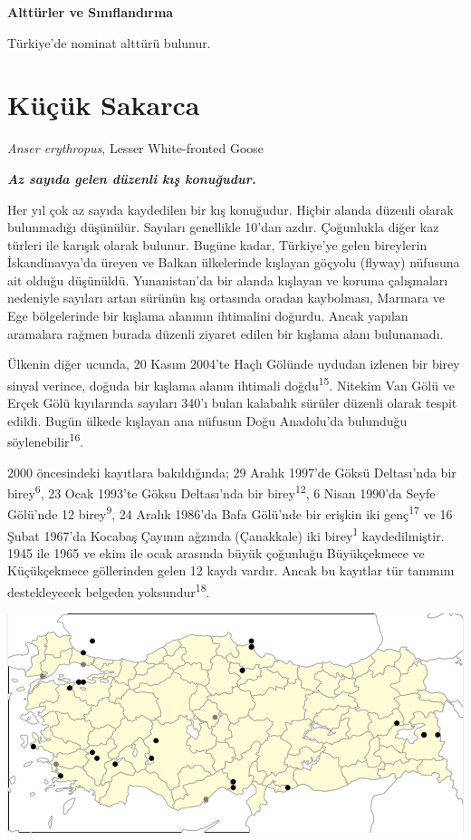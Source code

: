 \documentclass[
  letterpaper,
  DIV=11,
  numbers=noendperiod]{scrreprt}
\begin{document}
\textbf{Alttürler ve Sınıflandırma}

Türkiye'de nominat alttürü bulunur.

\section{Küçük Sakarca}\label{kuxfcuxe7uxfck-sakarca}

\emph{Anser erythropus}, Lesser White-fronted Goose

\textbf{\emph{Az sayıda gelen düzenli kış konuğudur.}}

Her yıl çok az sayıda kaydedilen bir kış konuğudur. Hiçbir alanda
düzenli olarak bulunmadığı düşünülür. Sayıları genellikle 10'dan azdır.
Çoğunlukla diğer kaz türleri ile karışık olarak bulunur. Bugüne kadar,
Türkiye'ye gelen bireylerin İskandinavya'da üreyen ve Balkan ülkelerinde
kışlayan göçyolu (flyway) nüfusuna ait olduğu düşünüldü. Yunanistan'da
bir alanda kışlayan ve koruma çalışmaları nedeniyle sayıları artan
sürünün kış ortasında oradan kaybolması, Marmara ve Ege bölgelerinde bir
kışlama alanının ihtimalini doğurdu. Ancak yapılan aramalara rağmen
burada düzenli ziyaret edilen bir kışlama alanı bulunamadı.

Ülkenin diğer ucunda, 20 Kasım 2004'te Haçlı Gölünde uydudan izlenen bir
birey sinyal verince, doğuda bir kışlama alanın ihtimali
doğdu\textsuperscript{15}. Nitekim Van Gölü ve Erçek Gölü kıyılarında
sayıları 340'ı bulan kalabalık sürüler düzenli olarak tespit edildi.
Bugün ülkede kışlayan ana nüfusun Doğu Anadolu'da bulunduğu
söylenebilir\textsuperscript{16}.

2000 öncesindeki kayıtlara bakıldığında; 29 Aralık 1997'de Göksü
Deltası'nda bir birey\textsuperscript{6}, 23 Ocak 1993'te Göksu
Deltası'nda bir birey\textsuperscript{12}, 6 Nisan 1990'da Seyfe
Gölü'nde 12 birey\textsuperscript{9}, 24 Aralık 1986'da Bafa Gölü'nde
bir erişkin iki genç\textsuperscript{17} ve 16 Şubat 1967'da Kocabaş
Çayının ağzında (Çanakkale) iki birey\textsuperscript{1} kaydedilmiştir.
1945 ile 1965 ve ekim ile ocak arasında büyük çoğunluğu Büyükçekmece ve
Küçükçekmece göllerinden gelen 12 kaydı vardır. Ancak bu kayıtlar tür
tanımını destekleyecek belgeden yoksundur\textsuperscript{18}.

\includegraphics[width=6.25in,height=\textheight]{images/harita_Anser_erythropus.png}
\end{document}
